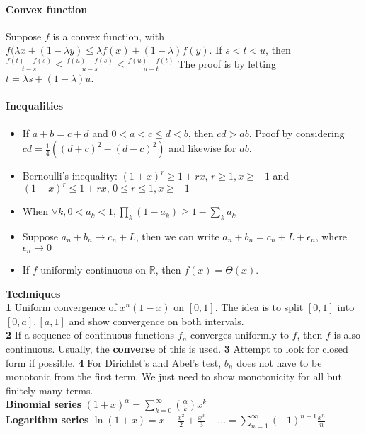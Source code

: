 \documentclass{article}
\begin{document}
\paragraph{Convex function} Suppose $f$ is a convex function, with $f(\lambda x+(1-\lambda y)\leq \lambda f(x)+(1-\lambda)f(y)$. If $s<t<u$, then 
	$\frac{f(t)-f(s)}{t-s}\leq \frac{f(u)-f(s)}{u-s}\leq \frac{f(u)-f(t)}{u-t}$
The proof is by letting $t=\lambda s+(1-\lambda)u$.
\paragraph{Inequalities}
\begin{itemize}
	\item If $a+b=c+d$ and $0 < a < c\leq d < b$, then $cd>ab$. Proof by considering $cd=\frac{1}{4}((d+c)^2-(d-c)^2)$ and likewise for $ab$.
	\item Bernoulli's inequality: $(1+x)^r\geq 1+rx,\, r\geq 1, x\geq -1$ and $(1+x)^r\leq 1+rx,\, 0\leq r\leq 1, x\geq -1$
	\item When $\forall k, 0< a_k < 1, \prod_k (1-a_k)\geq 1-\sum_k a_k$
	\item Suppose $a_n + b_n\rightarrow c_n+L$, then we can write $a_n + b_n = c_n + L + \epsilon_n$, where $\epsilon_n\rightarrow 0$
	\item If $f$ uniformly continuous on $\mathbb{R}$, then $f(x)=\Theta(x)$.
\end{itemize}
\textbf{Techniques}\\
\textbf{1} Uniform convergence of $x^n(1-x)$ on $[0,1]$. The idea is to split $[0,1]$ into $[0,a],[a,1]$ and show convergence on both intervals.\\
\textbf{2} If a sequence of continuous functions $f_n$ converges uniformly to $f$, then $f$ is also continuous. Usually, the \textbf{converse} of this is used. \textbf{3} Attempt to look for closed form if possible. \textbf{4} For Dirichlet's and Abel's test, $b_n$ does not have to be monotonic from the first term. We just need to show monotonicity for all but finitely many terms.\\
\textbf{Binomial series} $(1+x)^\alpha=\sum_{k=0}^\infty \binom{\alpha}{k}x^k$\\
\textbf{Logarithm series} $\ln(1+x)=x-\frac{x^2}{2}+\frac{x^3}{3}-\dots=\sum_{n=1}^\infty (-1)^{n+1}\frac{x^n}{n}$
\end{document}
